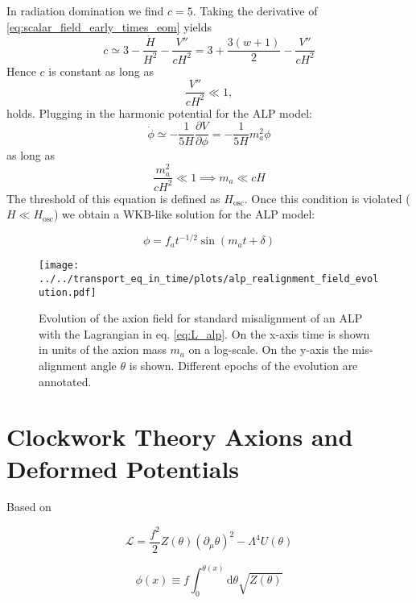 \documentclass[master,       %
               twoside,        %
               BCOR10mm,       %
               english,ngerman, %
               ]{GAUBM}
\begin{document}
\begin{otherlanguage}{english}
In radiation domination we find $c = 5$.
Taking the derivative of \eqref{eq:scalar_field_early_times_eom} yields
\begin{equation}
	c \simeq 3 - \frac{\dot{H}}{H^2} - \frac{V''}{c H^2}
	= 3 + \frac{3(w + 1)}{2} - \frac{V''}{c H^2}
\end{equation}
Hence $c$ is constant as long as
\begin{equation}
	\frac{V''}{c H^2} \ll 1,
\end{equation}
holds.
Plugging in the harmonic potential for the ALP model:
\begin{equation}
	\dot{\phi} \simeq - \frac{1}{5 H} \frac{\partial V}{\partial \phi} = - \frac{1}{5 H} m_a^2 \phi
\end{equation}
as long as
\begin{equation}
	\frac{m_a^2}{c H^2} \ll 1 \implies m_a \ll c H
\end{equation}
The threshold of this equation is defined as $H_\mathrm{osc}$.
Once this condition is violated ($H \ll H_\mathrm{osc}$) we obtain a WKB-like solution for the ALP model:

\begin{equation}
	\phi = f_a t^{-1/2} \sin(m_a t + \delta)
\end{equation}






\begin{figure}[h]
    \texttt{[image: ../../transport\_eq\_in\_time/plots/alp\_realignment\_field\_evolution.pdf]}
    \caption{Evolution of the axion field for standard misalignment of an ALP with the Lagrangian in eq. \eqref{eq:L_alp}. On the x-axis time is shown in units of the axion mass $m_a$ on a log-scale. On the y-axis the misalignment angle $\theta$ is shown. Different epochs of the evolution are annotated.}
\end{figure}

\section{Clockwork Theory Axions and Deformed Potentials}

Based on \cite{Deformed_potential_Bae_2019}

\begin{equation}
	\mathcal{L} = \frac{f^2}{2} Z(\theta) (\partial_\mu \theta)^2 - \Lambda^4 U(\theta)
\end{equation}

\begin{equation}
	\phi(x) \equiv f \int_0^{\theta(x)} \mathrm{d} \theta \sqrt{Z(\theta)}
\end{equation}


\end{otherlanguage}
\end{document}
